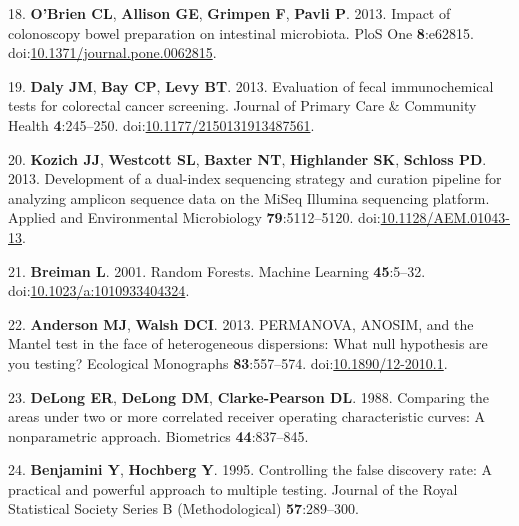 \documentclass[12pt,]{article}
\begin{document}
\hypertarget{ref-obrien_impact_2013}{}
18. \textbf{O'Brien CL}, \textbf{Allison GE}, \textbf{Grimpen F},
\textbf{Pavli P}. 2013. Impact of colonoscopy bowel preparation on
intestinal microbiota. PloS One \textbf{8}:e62815.
doi:\href{https://doi.org/10.1371/journal.pone.0062815}{10.1371/journal.pone.0062815}.

\hypertarget{ref-daly_evaluation_2013}{}
19. \textbf{Daly JM}, \textbf{Bay CP}, \textbf{Levy BT}. 2013.
Evaluation of fecal immunochemical tests for colorectal cancer
screening. Journal of Primary Care \& Community Health
\textbf{4}:245--250.
doi:\href{https://doi.org/10.1177/2150131913487561}{10.1177/2150131913487561}.

\hypertarget{ref-kozich_development_2013}{}
20. \textbf{Kozich JJ}, \textbf{Westcott SL}, \textbf{Baxter NT},
\textbf{Highlander SK}, \textbf{Schloss PD}. 2013. Development of a
dual-index sequencing strategy and curation pipeline for analyzing
amplicon sequence data on the MiSeq Illumina sequencing platform.
Applied and Environmental Microbiology \textbf{79}:5112--5120.
doi:\href{https://doi.org/10.1128/AEM.01043-13}{10.1128/AEM.01043-13}.

\hypertarget{ref-breiman_random_2001}{}
21. \textbf{Breiman L}. 2001. Random Forests. Machine Learning
\textbf{45}:5--32.
doi:\href{https://doi.org/10.1023/a:1010933404324}{10.1023/a:1010933404324}.

\hypertarget{ref-anderson_permanova_2013}{}
22. \textbf{Anderson MJ}, \textbf{Walsh DCI}. 2013. PERMANOVA, ANOSIM,
and the Mantel test in the face of heterogeneous dispersions: What null
hypothesis are you testing? Ecological Monographs \textbf{83}:557--574.
doi:\href{https://doi.org/10.1890/12-2010.1}{10.1890/12-2010.1}.

\hypertarget{ref-delong_comparing_1988}{}
23. \textbf{DeLong ER}, \textbf{DeLong DM}, \textbf{Clarke-Pearson DL}.
1988. Comparing the areas under two or more correlated receiver
operating characteristic curves: A nonparametric approach. Biometrics
\textbf{44}:837--845.

\hypertarget{ref-benjamini_controlling_1995}{}
24. \textbf{Benjamini Y}, \textbf{Hochberg Y}. 1995. Controlling the
false discovery rate: A practical and powerful approach to multiple
testing. Journal of the Royal Statistical Society Series B
(Methodological) \textbf{57}:289--300.
\end{document}
